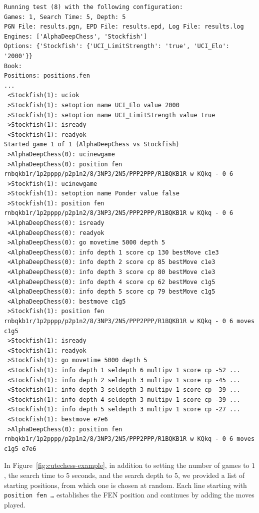 \begin{lstlisting}[basicstyle=\ttfamily\scriptsize, captionpos=b,breaklines=true, frame=single, caption={Example of \textit{Cutechess}}, label={fig:cutechess-example}]
Running test (8) with the following configuration:
Games: 1, Search Time: 5, Depth: 5
PGN File: results.pgn, EPD File: results.epd, Log File: results.log
Engines: ['AlphaDeepChess', 'Stockfish']
Options: {'Stockfish': {'UCI_LimitStrength': 'true', 'UCI_Elo': '2000'}}
Book: 
Positions: positions.fen
...
 <Stockfish(1): uciok
 >Stockfish(1): setoption name UCI_Elo value 2000
 >Stockfish(1): setoption name UCI_LimitStrength value true
 >Stockfish(1): isready
 <Stockfish(1): readyok
Started game 1 of 1 (AlphaDeepChess vs Stockfish)
 >AlphaDeepChess(0): ucinewgame
 >AlphaDeepChess(0): position fen rnbqkb1r/1p2pppp/p2p1n2/8/3NP3/2N5/PPP2PPP/R1BQKB1R w KQkq - 0 6
 >Stockfish(1): ucinewgame
 >Stockfish(1): setoption name Ponder value false
 >Stockfish(1): position fen rnbqkb1r/1p2pppp/p2p1n2/8/3NP3/2N5/PPP2PPP/R1BQKB1R w KQkq - 0 6
 >AlphaDeepChess(0): isready
 <AlphaDeepChess(0): readyok
 >AlphaDeepChess(0): go movetime 5000 depth 5
 <AlphaDeepChess(0): info depth 1 score cp 130 bestMove c1e3
 <AlphaDeepChess(0): info depth 2 score cp 85 bestMove c1e3
 <AlphaDeepChess(0): info depth 3 score cp 80 bestMove c1e3
 <AlphaDeepChess(0): info depth 4 score cp 62 bestMove c1g5
 <AlphaDeepChess(0): info depth 5 score cp 79 bestMove c1g5
 <AlphaDeepChess(0): bestmove c1g5
 >Stockfish(1): position fen rnbqkb1r/1p2pppp/p2p1n2/8/3NP3/2N5/PPP2PPP/R1BQKB1R w KQkq - 0 6 moves c1g5
 >Stockfish(1): isready
 <Stockfish(1): readyok
 >Stockfish(1): go movetime 5000 depth 5
 <Stockfish(1): info depth 1 seldepth 6 multipv 1 score cp -52 ...
 <Stockfish(1): info depth 2 seldepth 3 multipv 1 score cp -45 ...
 <Stockfish(1): info depth 3 seldepth 3 multipv 1 score cp -39 ...
 <Stockfish(1): info depth 4 seldepth 3 multipv 1 score cp -39 ...
 <Stockfish(1): info depth 5 seldepth 3 multipv 1 score cp -27 ...
 <Stockfish(1): bestmove e7e6
 >AlphaDeepChess(0): position fen rnbqkb1r/1p2pppp/p2p1n2/8/3NP3/2N5/PPP2PPP/R1BQKB1R w KQkq - 0 6 moves c1g5 e7e6
\end{lstlisting}

\noindent In Figure~\ref{fig:cutechess-example}, in addition to setting the number of games to $1$, the search time to $5$ seconds, and the search depth to $5$, we provided a list of starting positions, from which one is chosen at random. Each line starting with \texttt{position fen \ldots} establishes the FEN position and continues by adding the moves played.


